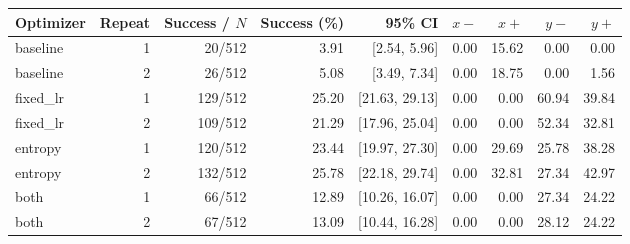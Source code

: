 \begin{tabular}{lrrrrrrrr}
\hline
Optimizer & Repeat & Success / $N$ & Success (\%) & 95\% CI & $x-$ & $x+$ & $y-$ & $y+$ \\
\hline
baseline & 1 & 20/512 & 3.91 & [2.54, 5.96] & 0.00 & 15.62 & 0.00 & 0.00 \\
baseline & 2 & 26/512 & 5.08 & [3.49, 7.34] & 0.00 & 18.75 & 0.00 & 1.56 \\
fixed\_lr & 1 & 129/512 & 25.20 & [21.63, 29.13] & 0.00 & 0.00 & 60.94 & 39.84 \\
fixed\_lr & 2 & 109/512 & 21.29 & [17.96, 25.04] & 0.00 & 0.00 & 52.34 & 32.81 \\
entropy & 1 & 120/512 & 23.44 & [19.97, 27.30] & 0.00 & 29.69 & 25.78 & 38.28 \\
entropy & 2 & 132/512 & 25.78 & [22.18, 29.74] & 0.00 & 32.81 & 27.34 & 42.97 \\
both & 1 & 66/512 & 12.89 & [10.26, 16.07] & 0.00 & 0.00 & 27.34 & 24.22 \\
both & 2 & 67/512 & 13.09 & [10.44, 16.28] & 0.00 & 0.00 & 28.12 & 24.22 \\
\hline
\end{tabular}
